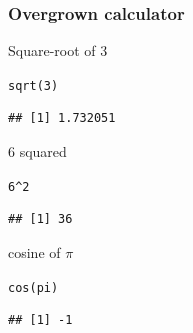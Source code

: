 \documentclass[color=usenames,dvipsnames]{beamer}\usepackage[]{graphicx}\usepackage[]{color}
\makeatletter
\newcommand{\hlnum}[1]{\textcolor[rgb]{0.69,0.494,0}{#1}}%
\newcommand{\hlopt}[1]{\textcolor[rgb]{0,0,0}{#1}}%
\newcommand{\hlstd}[1]{\textcolor[rgb]{0,0,0}{#1}}%
\newcommand{\hlkwd}[1]{\textcolor[rgb]{0.004,0.004,0.506}{#1}}%
\newenvironment{kframe}{%
 \def\at@end@of@kframe{}%
 \ifinner\ifhmode%
  \def\at@end@of@kframe{\end{minipage}}%
  \begin{minipage}{\columnwidth}%
 \fi\fi%
 \def\FrameCommand##1{\hskip\@totalleftmargin \hskip-\fboxsep
 \colorbox{shadecolor}{##1}\hskip-\fboxsep
     \hskip-\linewidth \hskip-\@totalleftmargin \hskip\columnwidth}%
 \MakeFramed {\advance\hsize-\width
   \@totalleftmargin\z@ \linewidth\hsize
   \@setminipage}}%
 {\par\unskip\endMakeFramed%
 \at@end@of@kframe}
\newenvironment{knitrout}{}{} %
\makeatother
\begin{document}
\begin{frame}[fragile]
  \frametitle{Overgrown calculator}
  \small
  Square-root of 3
\begin{knitrout}\small
{}\color{fgcolor}\begin{kframe}
\begin{alltt}
\hlkwd{sqrt}\hlstd{(}\hlnum{3}\hlstd{)}
\end{alltt}
\begin{verbatim}
## [1] 1.732051
\end{verbatim}
\end{kframe}
\end{knitrout}
\pause \vfill
  6 squared
\begin{knitrout}\small
{}\color{fgcolor}\begin{kframe}
\begin{alltt}
\hlnum{6}\hlopt{^}\hlnum{2}
\end{alltt}
\begin{verbatim}
## [1] 36
\end{verbatim}
\end{kframe}
\end{knitrout}
\pause \vfill
  cosine of $\pi$
\begin{knitrout}\small
{}\color{fgcolor}\begin{kframe}
\begin{alltt}
\hlkwd{cos}\hlstd{(pi)}
\end{alltt}
\begin{verbatim}
## [1] -1
\end{verbatim}
\end{kframe}
\end{knitrout}
\end{frame}













%
%


\end{document}
